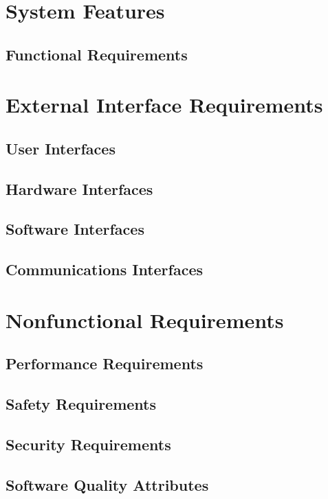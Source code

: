 \documentclass{article}
\begin{document}
\section{System Features}
	\subsection{Functional Requirements}

\section{External Interface Requirements}
	\subsection{User Interfaces}
	\subsection{Hardware Interfaces}
	\subsection{Software Interfaces}
	\subsection{Communications Interfaces}

\section{Nonfunctional Requirements}
	\subsection{Performance Requirements}
	\subsection{Safety Requirements}
	\subsection{Security Requirements}
	\subsection{Software Quality Attributes}
\end{document}
